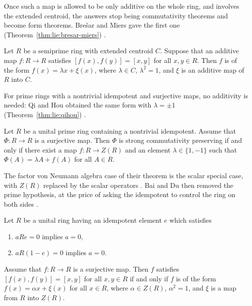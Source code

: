 Once such a map is allowed to be only additive on the whole ring, and
involves the extended centroid, the answers stop being commutativity
theorems and become form theorems.
Brešar and Miers gave the first one (Theorem~\ref{thm:lie:bresar-miers})
\cite[p.~457]{BresarMiers1994}.\begin{theorem}\label{thm:lie:bresar-miers}
Let $R$ be a semiprime ring with extended centroid $C$. Suppose that an
additive map $f\colon R\to R$ satisfies $[f(x),f(y)]=[x,y]$ for all
$x,y\in R$. Then $f$ is of the form $f(x)=\lambda x+\xi(x)$, where
$\lambda\in C$, $\lambda^{2}=1$, and $\xi$ is an additive map of $R$ into
$C$.
\end{theorem}

For prime rings with a nontrivial idempotent and surjective maps, no
additivity is needed: Qi and Hou obtained the same form with
$\lambda=\pm1$ (Theorem~\ref{thm:lie:qihou}) \cite[p.~2791]{QiHou2010}.

\begin{theorem}\label{thm:lie:qihou}
Let $R$ be a unital prime ring containing a nontrivial idempotent. Assume
that $\varPhi\colon R\to R$ is a surjective map. Then $\varPhi$ is strong
commutativity preserving if and only if there exist a map $f\colon R\to Z(R)$
and an element $\lambda\in\{1,-1\}$ such that $\varPhi(A)=\lambda A+f(A)$
for all $A\in R$.
\end{theorem}

The factor von Neumann algebra case of their theorem is the scalar special
case, with $Z(R)$ replaced by the scalar operators \cite[p.~2795]{QiHou2010}.
Bai and Du then removed the prime hypothesis, at the price of asking the
idempotent to control the ring on both sides \cite[p.~733]{BaiDu2014}.

\begin{theorem}\label{thm:lie:baidu-general}
Let $R$ be a unital ring having an idempotent element $e$ which satisfies
\begin{enumerate}
\item[(i)] $aRe=0$ implies $a=0$,
\item[(ii)] $aR(1-e)=0$ implies $a=0$.
\end{enumerate}
Assume that $f\colon R\to R$ is a surjective map. Then $f$ satisfies
$[f(x),f(y)]=[x,y]$ for all $x,y\in R$ if and only if $f$ is of the form
$f(x)=\alpha x+\xi(x)$ for all $x\in R$, where $\alpha\in Z(R)$,
$\alpha^{2}=1$, and $\xi$ is a map from $R$ into $Z(R)$.
\end{theorem}

